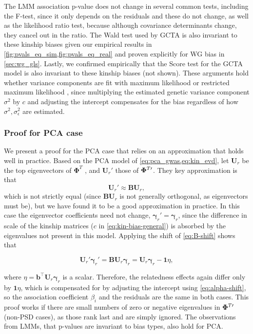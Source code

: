 \documentclass[11pt]{article}
\newcommand{\kinMat}[1][T]{%
  \ensuremath{%
    \mathbf{\Phi}^{#1}
  }%
  \xspace%
}%
\newcommand{\kinMatPrime}{%
  \ensuremath{%
    \mathbf{\Phi}^{T\prime}
  }%
  \xspace%
}%
\begin{document}
\begin{linenumbers}
The LMM association p-value does not change in several common tests, including the F-test, since it only depends on the residuals and these do not change, as well as the likelihood ratio test, because although covariance determinants change, they cancel out in the ratio.
The Wald test used by GCTA \citep{yang_advantages_2014} is also invariant to these kinship biases given our empirical results in \cref{fig:pvals_eq_sim,fig:pvals_eq_real} and proven explicitly for WG bias in \cref{sec:wg_gls}.
Lastly, we confirmed empirically that the Score test for the GCTA model is also invariant to these kinship biases (not shown).
These arguments hold whether variance components are fit with maximum likelihood or restricted maximum likelihood \citep{kang_efficient_2008, kang_variance_2010, yang_advantages_2014}, since multiplying the estimated genetic variance component $\sigma^2$ by $c$ and adjusting the intercept compensates for the bias regardless of how $\sigma^2, \sigma^2_\epsilon$ are estimated.

\subsubsection{Proof for PCA case}

We present a proof for the PCA case that relies on an approximation that holds well in practice.
Based on the PCA model of \cref{eq:pca_gwas,eq:kin_evd}, let $\mathbf{U}_r$ be the top eigenvectors of \kinMat, and $\mathbf{U}_r'$ those of $\kinMatPrime$.
They key approximation is that
\begin{equation}
  \label{eq:pc-shift}
  \mathbf{U}_r' \approx \mathbf{B} \mathbf{U}_r,
\end{equation}
which is not strictly equal (since $\mathbf{B} \mathbf{U}_r$ is not generally orthogonal, as eigenvectors must be), but we have found it to be a good approximation in practice.
In this case the eigenvector coefficients need not change, $\boldsymbol{\gamma}_r' = \boldsymbol{\gamma}_r$, since the difference in scale of the kinship matrices ($c$ in \cref{eq:kin-bias-general}) is absorbed by the eigenvalues not present in this model.
Applying the shift of \cref{eq:B-shift} shows that
\begin{linenomath*}
$$
\mathbf{U}_r' \boldsymbol{\gamma}_r'
=
\mathbf{B} \mathbf{U}_r \boldsymbol{\gamma}_r
=
\mathbf{U}_r \boldsymbol{\gamma}_r - \mathbf{1} \eta,
$$
\end{linenomath*}
where
$\eta = \mathbf{b}^\intercal \mathbf{U}_r \boldsymbol{\gamma}_r$
is a scalar.
Therefore, the relatedness effects again differ only by $\mathbf{1} \eta$, which is compensated for by adjusting the intercept using \cref{eq:alpha-shift}, so the association coefficient $\beta_i$ and the residuals are the same in both cases.
This proof works if there are small numbers of zero or negative eigenvalues in $\kinMatPrime$ (non-PSD cases), as those rank last and are simply ignored.
The observations from LMMs, that p-values are invariant to bias types, also hold for PCA.


\end{linenumbers}
\end{document}

